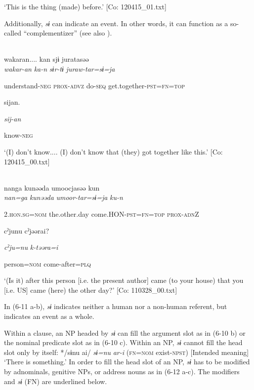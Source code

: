 \glt ‘This is the thing (made) before.’ [Co: 120415\_01.txt]
\z

Additionally, \textit{sɨ} can indicate an event. In other words, it can function as a so-called “complementizer” (see also ).

\ea\label{ex:6-11}
\ea{}\\
\gll  {\TM}  wakaran....  kan  sjɨ  juratasəə\\

      \textit{wakar-an}  \textit{ka-n}  \textit{sɨr-tɨ}  \textit{juraw-tar=sɨ=ja}

      understand-\textsc{neg}  \textsc{prox}-\textsc{advz}  do-\textsc{seq}  get.together-\textsc{pst}=\textsc{fn}=\textsc{top}

      sijan.

      \textit{sij-an}

      know-\textsc{neg}

\glt ‘(I) don’t know.... (I) don’t know that (they) got together like this.’ [Co: 120415\_00.txt]
\z

 \ex{}\\
{\TM}
\gll  nanga  kunəəda  umoocjasəə  kun\\

      \textit{nan=ga}  \textit{kunəəda}  \textit{umoor-tar=sɨ=ja}  \textit{ku-n}

      2.\textsc{hon}.\textsc{sg}=\textsc{nom}  the.other.day  come.HON-\textsc{pst}=\textsc{fn}=\textsc{top}  \textsc{prox}-\textsc{adn}Z

      cˀjunu  cˀjəərai?

      \textit{cˀju=nu}  \textit{k-təəra=i}

      person=\textsc{nom}  come-after=\textsc{plq}

\glt ‘(Is it) after this person [i.e. the present author] came (to your house) that you [i.e. US] came (here) the other day?’ [Co: 110328\_00.txt]
\z

In (6-11 a-b), \textit{sɨ} indicates neither a human nor a non-human referent, but indicates an event as a whole.

  Within a clause, an NP headed by \textit{sɨ} can fill the argument slot as in (6-10 b) or the nominal predicate slot as in (6-10 c). Within an NP, \textit{sɨ} cannot fill the head slot only by itself: */sɨnu ai/ \textit{sɨ=nu} \textit{ar-i} (\textsc{fn}=\textsc{nom} exist-\textsc{npst}) [Intended meaning] ‘There is something.’ In order to fill the head slot of an NP, \textit{sɨ} has to be modified by adnominals, genitive NPs, or address nouns as in (6-12 a-c). The modifiers and \textit{sɨ} (FN) are underlined below.

